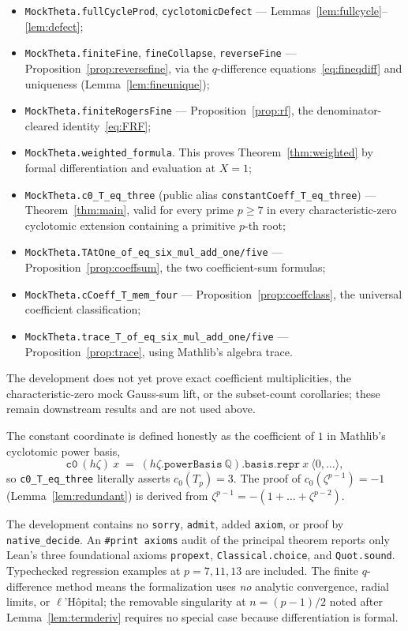 \documentclass[11pt]{article}
\theoremstyle{definition}
\newcommand{\Q}{\mathbb{Q}}
\begin{document}
\begin{itemize}[leftmargin=2em]
  \item \texttt{MockTheta.fullCycleProd}, \texttt{cyclotomicDefect} --- Lemmas~\ref{lem:fullcycle}--\ref{lem:defect};
  \item \texttt{MockTheta.finiteFine}, \texttt{fineCollapse}, \texttt{reverseFine} --- Proposition~\ref{prop:reversefine}, via the $q$-difference equations~\eqref{eq:fineqdiff} and uniqueness (Lemma~\ref{lem:fineunique});
  \item \texttt{MockTheta.finiteRogersFine} --- Proposition~\ref{prop:rf}, the denominator-cleared identity~\eqref{eq:FRF};
  \item \texttt{MockTheta.weighted\_formula}. This proves
  Theorem~\ref{thm:weighted} by formal differentiation and evaluation at
  $X=1$;
  \item \texttt{MockTheta.c0\_T\_eq\_three} (public alias \texttt{constantCoeff\_T\_eq\_three}) --- Theorem~\ref{thm:main}, valid for every prime $p\ge 7$ in every characteristic-zero cyclotomic extension containing a primitive $p$-th root;
  \item \texttt{MockTheta.TAtOne\_of\_eq\_six\_mul\_add\_one/five} --- Proposition~\ref{prop:coeffsum}, the two coefficient-sum formulas;
  \item \texttt{MockTheta.cCoeff\_T\_mem\_four} --- Proposition~\ref{prop:coeffclass}, the universal coefficient classification;
  \item \texttt{MockTheta.trace\_T\_of\_eq\_six\_mul\_add\_one/five} --- Proposition~\ref{prop:trace}, using Mathlib's algebra trace.
\end{itemize}

The development does not yet prove exact coefficient multiplicities, the
characteristic-zero mock Gauss-sum lift, or the subset-count corollaries;
these remain downstream results and are not used above.

The constant coordinate is defined honestly as the coefficient of $1$ in Mathlib's cyclotomic power basis,
\[
  \texttt{c0}\ (h\zeta)\ x \;=\; (h\zeta.\texttt{powerBasis}\ \Q).\texttt{basis.repr}\ x\ \langle 0,\dots\rangle,
\]
so \texttt{c0\_T\_eq\_three} literally asserts $c_0(T_p)=3$. The proof of $c_0(\zeta^{p-1})=-1$ (Lemma~\ref{lem:redundant}) is derived from $\zeta^{p-1}=-(1+\dots+\zeta^{p-2})$.

The development contains no \texttt{sorry}, \texttt{admit}, added \texttt{axiom}, or proof by \texttt{native\_decide}. An \texttt{\#print axioms} audit of the principal theorem reports only Lean's three foundational axioms \texttt{propext}, \texttt{Classical.choice}, and \texttt{Quot.sound}. Typechecked regression examples at $p=7,11,13$ are included. The finite $q$-difference method means the formalization uses \emph{no} analytic convergence, radial limits, or $\ell$'H\^opital; the removable singularity at $n=(p-1)/2$ noted after Lemma~\ref{lem:termderiv} requires no special case because differentiation is formal.
\end{document}
